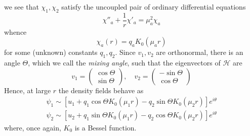 we see that \( \chi_1, \chi_2 \) satisfy the uncoupled pair of ordinary 
differential equations
\begin{equation}
    \chi''_a + \frac{1}{r}\chi'_a = \mu_a^2 \chi_a
    \label{eq:18}
\end{equation}
whence 
\begin{equation}
    \chi_a(r) = q_a K_0(\mu_a r)
    \label{eq:19}
\end{equation}
for some (unknown) constants \( q_1, q_2 \). Since \( v_1, v_2 \) are 
orthonormal, there is an angle \( \Theta \), which we call the \emph{mixing 
angle}, such that the eigenvectors of \( \mathcal{H} \) are
\begin{equation}
    v_1 = \left( \begin{array}{c}
        \cos\Theta \\
        \sin\Theta
    \end{array} \right), \quad
    v_2 = \left( \begin{array}{c}
        -\sin\Theta \\
        \cos\Theta
    \end{array} \right)
    \label{eq:20}
\end{equation}
Hence, at large \( r \) the density fields behave as
\begin{gather}
    \psi_1 \sim \left[ u_1 + q_1\cos\Theta K_0(\mu_1 r) - 
        q_2\sin\Theta K_0(\mu_2 r) \right]e^{i\theta} \nonumber \\

    \psi_2 \sim \left[ u_2 + q_1\sin\Theta K_0(\mu_1 r) - 
        q_2\cos\Theta K_0(\mu_2 r) \right]e^{i\theta}
    \label{eq:21}
\end{gather}
where, once again, \( K_0 \) is a Bessel function.

